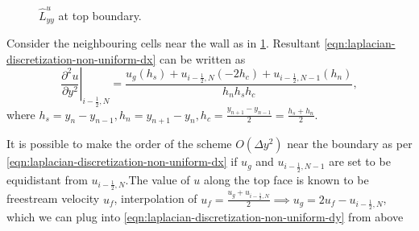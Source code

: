 \documentclass{article}
\begin{document}
\begin{figure}[h]
  \caption{$\hat{L}^u_{yy}$ at top boundary.}\label{fig:luxx-top}
\end{figure}

Consider the neighbouring cells near the wall as in \cref{fig:luxx-top}. Resultant \cref{eqn:laplacian-discretization-non-uniform-dx}  can be written as
\begin{equation}\label{eqn:laplacian-discretization-non-uniform-dy}
\left.\frac{\partial^2 u}{\partial y^2}\right|_{i-\frac{1}{2},N}=\frac{u_g\left(h_s\right)+u_{i-\frac{1}{2},N}\left(-2 h_c\right)+u_{i-\frac{1}{2},N-1}\left(h_n\right)}{h_n h_s h_c},
\end{equation}
where $h_s=y_{n}-y_{n-1}, h_n = y_{n+1}-y_n, h_c = \frac{y_{n+1}-y_{n-1}}{2}=\frac{h_s+h_n}{2}$.

It is possible to make the order of the scheme $O(\Delta y^2)$ near the boundary as per \cref{eqn:laplacian-discretization-non-uniform-dx} if $u_g$ and $u_{i-\frac{1}{2},N-1}$ are set to be equidistant from $u_{i-\frac{1}{2},N}$.The value of $u$ along the top face is known to be freestream velocity $u_{{f}}$, interpolation of $u_{f} = \frac{u_g+u_{i-\frac{1}{2},N}}{2}\implies u_g=2u_{f}-u_{i-\frac{1}{2},N}$, which we can plug into \cref{eqn:laplacian-discretization-non-uniform-dy} from above
\end{document}
